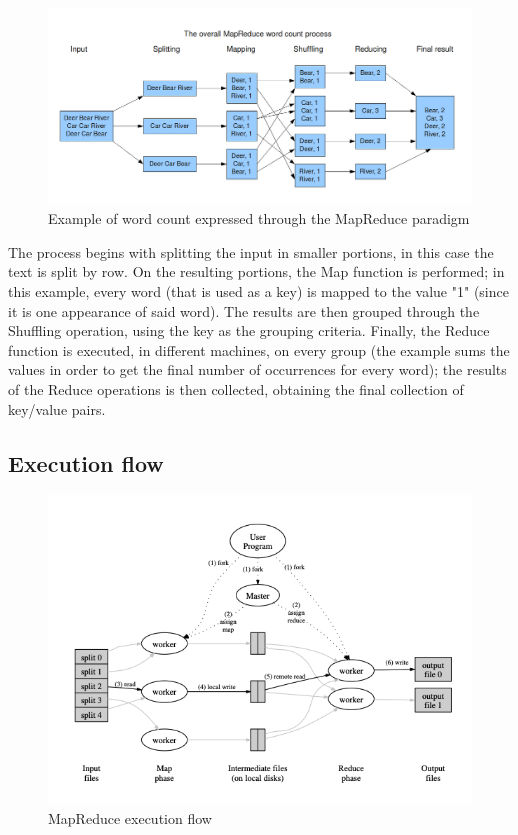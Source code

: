 \begin{figure}[H]
    \centering
    \includegraphics[width=\linewidth]{document/chapters/chapter_4/images/mapreduce_example.png}
    \caption{Example of word count expressed through the MapReduce paradigm \cite{mapreduce_example_site}}
    \label{fig:mapreduce_example}
\end{figure}

The process begins with splitting the input in smaller portions, in this case the text is split by row. On the resulting portions, the Map function is performed; in this example, every word (that is used as a key) is mapped to the value "1" (since it is one appearance of said word). The results are then grouped through the Shuffling operation, using the key as the grouping criteria. Finally, the Reduce function is executed, in different machines, on every group (the example sums the values in order to get the final number of occurrences for every word); the results of the Reduce operations is then collected, obtaining the final collection of key/value pairs.

\subsection{Execution flow}

\begin{figure}[H]
    \centering
    \includegraphics[width=\linewidth]{document/chapters/chapter_4/images/mapreduce_execution_flow.png}
    \caption{MapReduce execution flow \cite{google_mapreduce}}
    \label{fig:mapreduce_execution_flow}
\end{figure}

